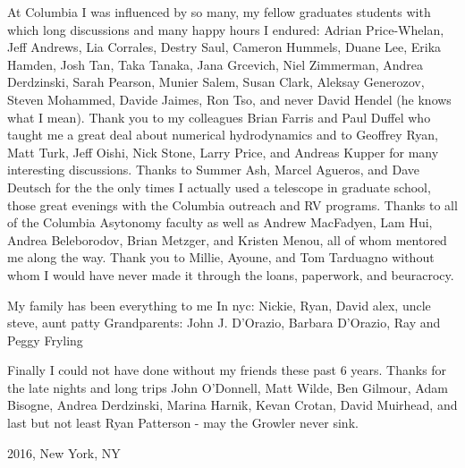 At Columbia I was influenced by so many, my fellow graduates students with
which long discussions and many happy hours I endured: Adrian Price-Whelan,
Jeff Andrews, Lia Corrales, Destry Saul, Cameron Hummels, Duane Lee, Erika
Hamden, Josh Tan, Taka Tanaka, Jana Grcevich, Niel Zimmerman, Andrea
Derdzinski, Sarah Pearson, Munier Salem, Susan Clark, Aleksay Generozov,
Steven Mohammed, Davide Jaimes, Ron Tso, and never David Hendel (he knows what
I mean). Thank you to my colleagues Brian Farris and Paul Duffel who taught me
a great deal about numerical hydrodynamics and to Geoffrey Ryan, Matt Turk,
Jeff Oishi, Nick Stone, Larry Price, and Andreas Kupper for many interesting
discussions. Thanks to Summer Ash, Marcel Agueros, and Dave Deutsch for the
the only times I actually used a telescope in graduate school, those great
evenings with the Columbia outreach and RV programs. Thanks to all of the
Columbia Asytonomy faculty as well as Andrew MacFadyen, Lam Hui, Andrea
Beleborodov, Brian Metzger, and Kristen Menou, all of whom mentored me along
the way. Thank you to Millie, Ayoune, and Tom Tarduagno without whom I would
have never made it through the loans, paperwork, and beuracrocy.



My family has been everything to me 
In nyc: Nickie, Ryan, David
alex, uncle steve, aunt patty
Grandparents: John J. D'Orazio, Barbara D'Orazio, Ray and Peggy Fryling



Finally I could not have done without my friends these past 6 years. Thanks for the late nights and long trips John O'Donnell, Matt Wilde, Ben Gilmour, Adam Bisogne, Andrea Derdzinski, Marina Harnik, Kevan Crotan, David Muirhead, and last but not least Ryan Patterson - may the Growler never sink.














\vspace{1.8cm}
2016, New York, NY

